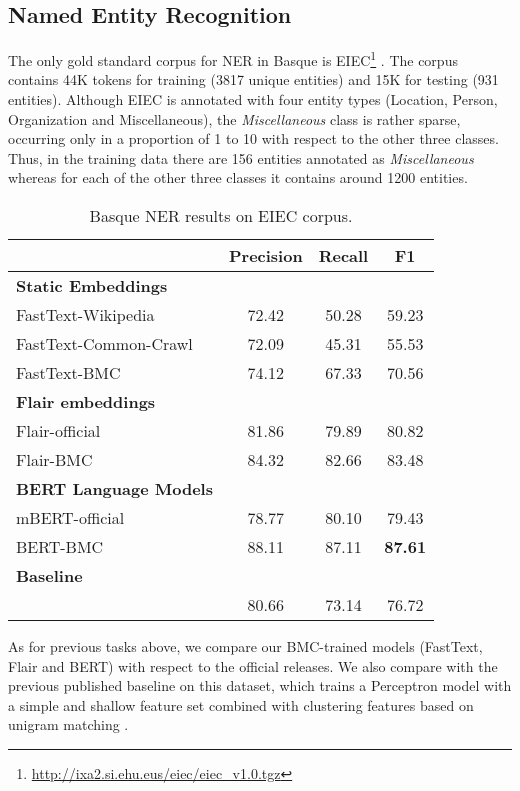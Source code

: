 \documentclass[10pt, a4paper]{article}
\begin{document}
\subsection{Named Entity Recognition}\label{sec:named-entity-recogn}

The only gold standard corpus for NER in Basque is EIEC\footnote{\scriptsize{\url{http://ixa2.si.ehu.eus/eiec/eiec_v1.0.tgz}}} \cite{alegria2006lessons}. The corpus contains 44K tokens for training (3817 unique entities) and 15K for testing (931 entities). Although EIEC is annotated with four entity types (Location, Person, Organization and Miscellaneous), the \emph{Miscellaneous} class is rather sparse, occurring only in a proportion of 1 to 10 with respect to the other three classes. Thus, in the training data there are 156 entities annotated as \emph{Miscellaneous} whereas for each of the other three classes it contains around 1200 entities.

\begin{table}[!ht]\footnotesize
\centering
\begin{tabular}{@{\hspace{0.3cm}}lccc} \hline
 \textbf{} &\textbf{Precision} & \textbf{Recall} & \textbf{F1} \\ \hline
\textbf{Static Embeddings} & & &  \\
FastText-Wikipedia & 72.42 & 50.28 & 59.23 \\
FastText-Common-Crawl & 72.09 & 45.31 & 55.53 \\
FastText-BMC  & 74.12 & 67.33 & 70.56 \\
\hline%
\textbf{Flair embeddings}\\
Flair-official & 81.86 & 79.89 & 80.82 \\
Flair-BMC & 84.32 & 82.66 & 83.48 \\ \hline
\textbf{BERT Language Models} \\
mBERT-official  & 78.77 & 80.10 & 79.43 \\
BERT-BMC  & 88.11 & 87.11& \textbf{87.61} \\ \hline
\textbf{Baseline} \\
\cite{agerri2016robust} & 80.66 & 73.14 & 76.72 \\ \hline
\end{tabular}
\caption{Basque NER results on EIEC corpus.}\label{tab:ner}
\end{table}

As for previous tasks above, we compare our BMC-trained models (FastText, Flair and BERT) with respect to the official releases. We also compare with the previous published baseline on this dataset, which trains a Perceptron model with a simple and shallow feature set combined with clustering features based on unigram matching \cite{agerri2016robust}.
\end{document}
